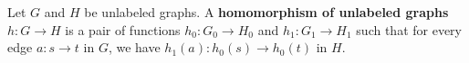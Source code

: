 \begin{definition}
    \label{def:unlabeled_graph:homomorphism}
    Let \( G \) and \( H \) be unlabeled graphs. A \textbf{homomorphism of unlabeled graphs} $h: G \mathop{\to} H$ is a pair of functions $h_0: G_0 \mathop{\to} H_0 $ and $h_1: G_1 \mathop{\to} H_1$ such that for every edge \( a: s \mathop{\to} t \) in \( G \), we have \( h_1(a) : h_0(s) \mathop{\to} h_0(t) \) in \( H \).
\end{definition}